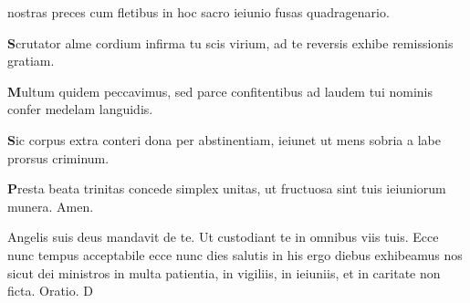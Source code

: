 \begin{multicols*}{2}
{nostras preces cum fletibus
in hoc sacro ieiunio
fusas quadragenario.
\par {\bfseries \color{Red} S}crutator alme cordium
infirma tu scis virium,
ad te reversis exhibe
remissionis gratiam.
\par {\bfseries \color{Blue} M}ultum quidem peccavimus,
sed parce confitentibus
ad laudem tui nominis
confer medelam languidis.
\par {\bfseries \color{Red} S}ic corpus extra conteri
dona per abstinentiam,
ieiunet ut mens sobria
a labe prorsus criminum.
\par {\bfseries \color{Blue} P}resta beata trinitas
concede simplex unitas,
ut fructuosa sint tuis
ieiuniorum munera. Amen.
}
\newline \V Angelis suis deus mandavit de te.
\newline \R Ut custodiant te in omnibus viis tuis.
 Ecce nunc tempus acceptabile ecce nunc dies salutis in his ergo diebus exhibeamus nos sicut dei ministros in multa patientia, in vigiliis, in ieiuniis, et in caritate non ficta. {\color{Red} Oratio.}
\lettrine[lines=2]{\zallmancaps \color{Red} D}{}








\end{multicols*}
